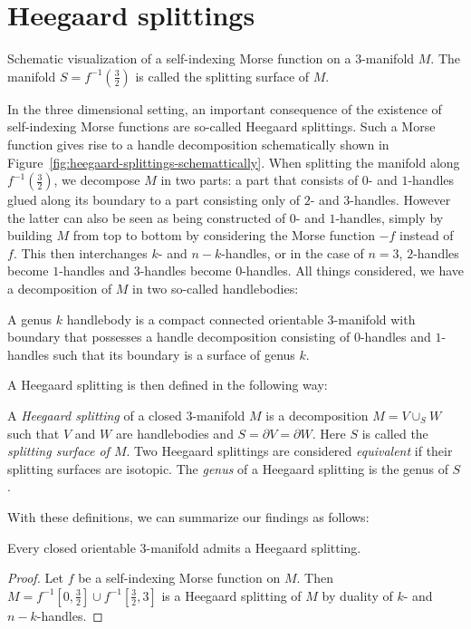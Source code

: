 \section{Heegaard splittings}
\begin{marginfigure}
    \centering
    \caption{Schematic visualization of a self-indexing Morse function on a $3$-manifold $M$.
        The manifold $S = f^{-1}(\frac{3}{2})$ is called the splitting surface of $M$.
    }
    \label{fig:heegaard-splittings-schemattically}
\end{marginfigure}
In the three dimensional setting, an important consequence of the existence of self-indexing Morse functions are so-called Heegaard splittings.
Such a Morse function gives rise to a handle decomposition schematically shown in Figure~\ref{fig:heegaard-splittings-schemattically}. When splitting the manifold along $f^{-1}(\frac{3}{2})$, we decompose $M$ in two parts: a part that consists of $0$- and $1$-handles glued along its boundary to a part consisting only of $2$- and  $3$-handles.
However the latter can also be seen as being constructed of $0$- and $1$-handles, simply by building $M$ from top to bottom by considering the Morse function $-f$ instead of $f$. This then interchanges $k$- and $n-k$-handles, or in the case of $n=3$, $2$-handles  become $1$-handles and $3$-handles become $0$-handles.
All things considered, we have a decomposition of $M$ in two so-called handlebodies:
\begin{definition}
    A genus $k$ handlebody is a compact connected orientable $3$-manifold with boundary that possesses a handle decomposition consisting of $0$-handles and $1$-handles such that its boundary is a surface of genus $k$.
\end{definition}
A Heegaard splitting is then defined in the following way:
\begin{definition}
    A \emph{Heegaard splitting} of a closed $3$-manifold $M$ is a decomposition $M = V \cup _S W$ such that $V$ and $W$ are handlebodies and  $S = \partial V = \partial W$. Here  $S$ is called the \emph{splitting surface of $M$}.
    Two Heegaard splittings are considered \emph{equivalent} if their splitting surfaces are isotopic. The \emph{genus} of a Heegaard splitting is the genus of $S$.
\end{definition}

With these definitions, we can summarize our findings as follows:
\begin{theorem}[Moise]
    Every closed orientable $3$-manifold admits a Heegaard splitting.
\end{theorem}
\begin{proof}
    Let $f$ be a self-indexing Morse function on $M$.
    Then $M = f^{-1}\left[0, \tfrac{3}{2}\right] \cup f^{-1}\left[\tfrac{3}{2}, 3\right]$ is a Heegaard splitting of $M$ by duality of $k$- and $n-k$-handles.
\end{proof}

